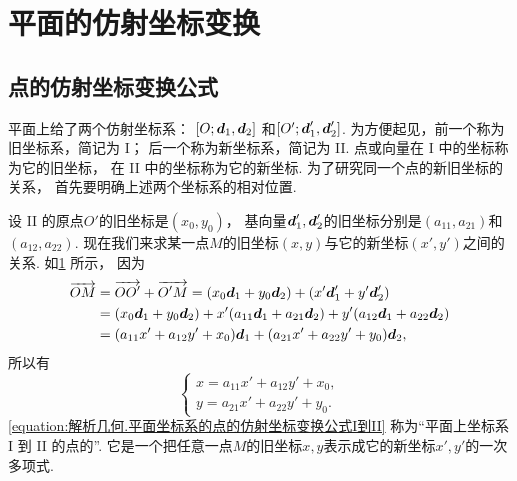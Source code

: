 \section{平面的仿射坐标变换}
\subsection{点的仿射坐标变换公式}
平面上给了两个仿射坐标系：
\([O;\boldsymbol{d}_1,\boldsymbol{d}_2]\)
和\([O';\boldsymbol{d}_1',\boldsymbol{d}_2']\).
为方便起见，前一个称为旧坐标系，简记为 I；
后一个称为新坐标系，简记为 II.
点或向量在 I 中的坐标称为它的旧坐标，
在 II 中的坐标称为它的新坐标.
为了研究同一个点的新旧坐标的关系，
首先要明确上述两个坐标系的相对位置.

\begin{figure}[hbt]
	\centering
	\caption{}
	\label{figure:解析几何.平面的仿射坐标变换}
\end{figure}

设 II 的原点\(O'\)的旧坐标是\((x_0,y_0)\)，
基向量\(\boldsymbol{d}_1',\boldsymbol{d}_2'\)的旧坐标分别是\((a_{11},a_{21})\)和\((a_{12},a_{22})\).
现在我们来求某一点\(M\)的旧坐标\((x,y)\)与它的新坐标\((x',y')\)之间的关系.
如\cref{figure:解析几何.平面的仿射坐标变换} 所示，
因为\begin{align*}
	\overrightarrow{OM}
	&= \overrightarrow{O O'} + \overrightarrow{O' M}
	= (x_0 \boldsymbol{d}_1 + y_0 \boldsymbol{d}_2)
	+ (x' \boldsymbol{d}_1' + y' \boldsymbol{d}_2') \\
	&= (x_0 \boldsymbol{d}_1 + y_0 \boldsymbol{d}_2)
	+ x' (a_{11} \boldsymbol{d}_1 + a_{21} \boldsymbol{d}_2)
	+ y' (a_{12} \boldsymbol{d}_1 + a_{22} \boldsymbol{d}_2) \\
	&= (a_{11} x' + a_{12} y' + x_0) \boldsymbol{d}_1
	+ (a_{21} x' + a_{22} y' + y_0) \boldsymbol{d}_2,
\end{align*}
所以有\begin{equation}\label{equation:解析几何.平面坐标系的点的仿射坐标变换公式I到II}
	\left\{ \begin{array}{l}
		x = a_{11} x' + a_{12} y' + x_0, \\
		y = a_{21} x' + a_{22} y' + y_0.
	\end{array} \right.
\end{equation}
\cref{equation:解析几何.平面坐标系的点的仿射坐标变换公式I到II}
称为“平面上坐标系 I 到 II 的点的”.
它是一个把任意一点\(M\)的旧坐标\(x,y\)表示成它的新坐标\(x',y'\)的一次多项式.

